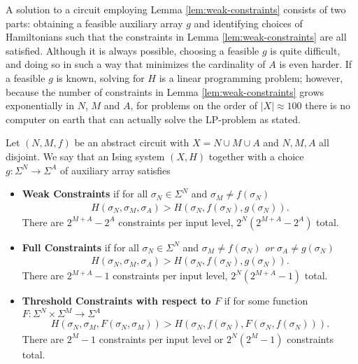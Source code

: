 \documentclass{article}
\begin{document}
A solution to a circuit employing Lemma \ref{lem:weak-constraints} consists of two parts: obtaining a feasible auxiliary array $g$ and identifying choices of Hamiltonians such that the constraints in Lemma \ref{lem:weak-constraints} are all satisfied. Although it is always possible, choosing a feasible $g$ is quite difficult, and doing so in such a way that minimizes the cardinality of $A$ is even harder. If a feasible $g$ is known, solving for $H$ is a linear programming problem; however, because the number of constraints in Lemma \ref{lem:weak-constraints} grows exponentially in $N$, $M$ and $A$, for problems on the order of $|X| \approx 100$ there is no computer on earth that can actually solve the LP-problem as stated.

\begin{defn}\label{defn:constraints}
  Let $(N,M,f)$ be an abstract circuit with $X = N \cup M \cup A$ and $N, M, A$ all disjoint. We say that an Ising system $(X, H)$ together with a choice $g: \Sigma^N\to \Sigma^A$ of auxiliary array satisfies
  \begin{itemize}
    \item \textbf{Weak Constraints} if for all $\sigma_N \in \Sigma^N$ and $\sigma_M \neq f(\sigma_N)$
      \begin{align*}
        H(\sigma_N, \sigma_M, \sigma_A) > H(\sigma_N, f(\sigma_N), g(\sigma_N)).
      \end{align*}
      There are $2^{M + A} - 2^A$ constraints per input level, $2^N(2^{M+A} - 2^A)$ total.
    \item \textbf{Full Constraints} if for all $\sigma_N \in \Sigma^N$ and $\sigma_M \neq f(\sigma_N)$ \emph{or} $\sigma_A \neq g(\sigma_N)$
      \begin{align*}
        H(\sigma_N, \sigma_M, \sigma_A) > H(\sigma_N, f(\sigma_N), g(\sigma_N)).
      \end{align*}
      There are $2^{M+A} - 1$ constraints per input level, $2^N(2^{M+A} - 1)$ total.
    \item \textbf{Threshold Constraints with respect to $F$} if for some function $F:\Sigma^{N} \times \Sigma^M \to \Sigma^A$
      \begin{align*}
        H(\sigma_N, \sigma_M, F(\sigma_N, \sigma_M)) > H(\sigma_N, f(\sigma_N), F(\sigma_N, f(\sigma_N))).
      \end{align*}
      There are $2^M - 1$ constraints per input level or $2^N(2^M - 1)$ constraints total.
  \end{itemize}
\end{defn}
\end{document}
